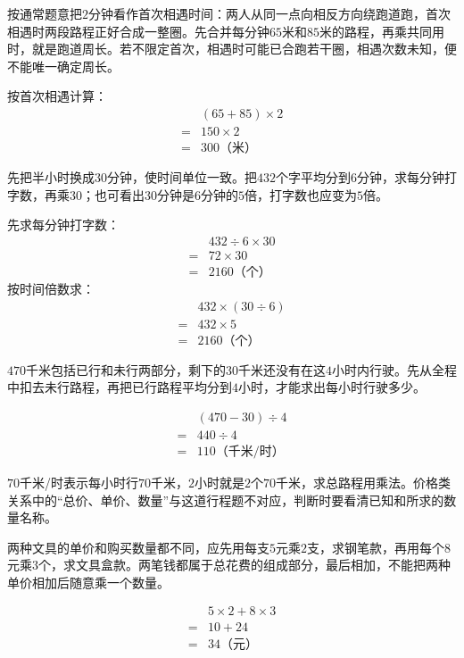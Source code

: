 \documentclass[multi=snippet,border=0pt]{standalone}
\newenvironment{snippet}[3]{\begin{minipage}{#1bp}\color{answerred}\fontsize{#2}{#3}\selectfont\raggedright}{\end{minipage}}
\begin{document}
\begin{snippet}{505}{11.5}{14}按通常题意把\(2\)分钟看作首次相遇时间：两人从同一点向相反方向绕跑道跑，首次相遇时两段路程正好合成一整圈。先合并每分钟\(65\)米和\(85\)米的路程，再乘共同用时，就是跑道周长。若不限定首次，相遇时可能已合跑若干圈，相遇次数未知，便不能唯一确定周长。\par 按首次相遇计算：\[\begin{aligned}&(65+85)\times2\\={}&150\times2\\={}&300\text{（米）}\end{aligned}\]\end{snippet}
\begin{snippet}{505}{11.5}{14}先把半小时换成\(30\)分钟，使时间单位一致。把\(432\)个字平均分到\(6\)分钟，求每分钟打字数，再乘\(30\)；也可看出\(30\)分钟是\(6\)分钟的\(5\)倍，打字数也应变为\(5\)倍。\par 先求每分钟打字数：\[\begin{aligned}&432\div6\times30\\={}&72\times30\\={}&2160\text{（个）}\end{aligned}\]按时间倍数求：\[\begin{aligned}&432\times(30\div6)\\={}&432\times5\\={}&2160\text{（个）}\end{aligned}\]\end{snippet}
\begin{snippet}{505}{11.5}{14}\(470\)千米包括已行和未行两部分，剩下的\(30\)千米还没有在这\(4\)小时内行驶。先从全程中扣去未行路程，再把已行路程平均分到\(4\)小时，才能求出每小时行驶多少。\par \[\begin{aligned}&(470-30)\div4\\={}&440\div4\\={}&110\text{（千米/时）}\end{aligned}\]\end{snippet}
\begin{snippet}{505}{11.5}{14}\(70\)千米/时表示每小时行\(70\)千米，\(2\)小时就是\(2\)个\(70\)千米，求总路程用乘法。价格类关系中的“总价、单价、数量”与这道行程题不对应，判断时要看清已知和所求的数量名称。\end{snippet}
\begin{snippet}{505}{11.5}{14}两种文具的单价和购买数量都不同，应先用每支\(5\)元乘\(2\)支，求钢笔款，再用每个\(8\)元乘\(3\)个，求文具盒款。两笔钱都属于总花费的组成部分，最后相加，不能把两种单价相加后随意乘一个数量。\par \[\begin{aligned}&5\times2+8\times3\\={}&10+24\\={}&34\text{（元）}\end{aligned}\]\end{snippet}
\end{document}
